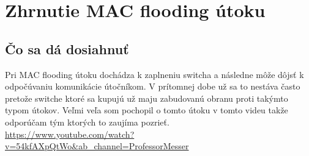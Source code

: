 \chapter{Zhrnutie MAC flooding útoku}
\section{Čo sa dá dosiahnuť}
Pri MAC flooding útoku dochádza k zaplneniu switcha a následne môže dôjsť k odpočúvaniu komunikácie útočníkom. V prítomnej dobe už sa to nestáva často pretože switche ktoré sa kupujú už maju zabudovanú obranu proti takýmto typom útokov. Veľmi veľa som pochopil o tomto útoku v tomto videu takže odporúčam tým ktorých to zaujíma pozrieť.\\ \url{https://www.youtube.com/watch?v=54kfAXpQtWo&ab_channel=ProfessorMesser}

